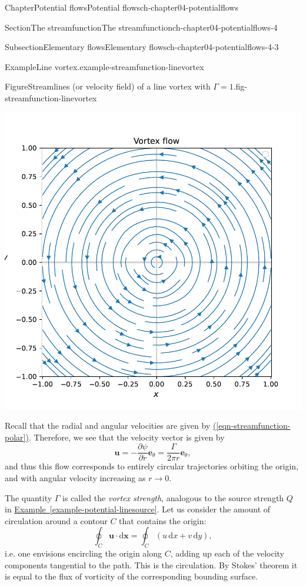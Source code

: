 \documentclass[oneside,10pt,]{book}
\newcommand{\xreffont}{\relax}
\numberwithin{equation}{section}
\newcommand{\de}{\mathrm{d}}
\newcommand{\pd}[2]{\frac{\partial#1}{\partial#2}}
\newcommand{\bx}{\boldsymbol{x}}
\newcommand{\be}{\boldsymbol{e}}
\newcommand{\bu}{\boldsymbol{u}}
\begin{document}
\begin{chapterptx}{Chapter}{Potential flows}{}{Potential flows}{}{}{ch-chapter04-potentialflows}
\begin{sectionptx}{Section}{The streamfunction}{}{The streamfunction}{}{}{ch-chapter04-potentialflows-4}
\begin{subsectionptx}{Subsection}{Elementary flows}{}{Elementary flows}{}{}{ch-chapter04-potentialflows-4-3}
\begin{example}{Example}{Line vortex.}{example-streamfunction-linevortex}
\begin{figureptx}{Figure}{Streamlines (or velocity field) of a line vortex with \(\Gamma = 1\).}{fig-streamfunction-linevortex}{}
\begin{image}{0.05}{0.9}{0.05}{}
\includegraphics[width=\linewidth]{external/linevortex.pdf}
\end{image}%
\tcblower
\end{figureptx}%
Recall that the radial and angular velocities are given by \hyperref[eqn-streamfunction-polar]{({\xreffont\ref{eqn-streamfunction-polar}})}. Therefore, we see that the velocity vector is given by%
\begin{equation*}
\bu = -\pd{\psi}{r} \be_{\theta} = \frac{\Gamma}{2\pi r} \be_{\theta},
\end{equation*}
and thus this flow corresponds to entirely circular trajectories orbiting the origin, and with angular velocity increasing as \(r \to 0\).%
\par
The quantity \(\Gamma\) is called the \emph{vortex strength}, analogous to the source strength \(Q\) in \hyperref[example-potential-linesource]{Example~{\xreffont\ref{example-potential-linesource}}}. Let us consider the amount of circulation around a contour \(C\) that contains the origin:%
\begin{equation*}
\oint_C \bu \cdot \de{\bx} = \oint_C (u \, \de{x} + v \, \de{y}),
\end{equation*}
i.e. one envisions encircling the origin along \(C\), adding up each of the velocity components tangential to the path. This is the circulation. By Stokes' theorem it is equal to the flux of vorticity of the corresponding bounding surface.%

\end{example}
\end{subsectionptx}
\end{sectionptx}
\end{chapterptx}
\end{document}
